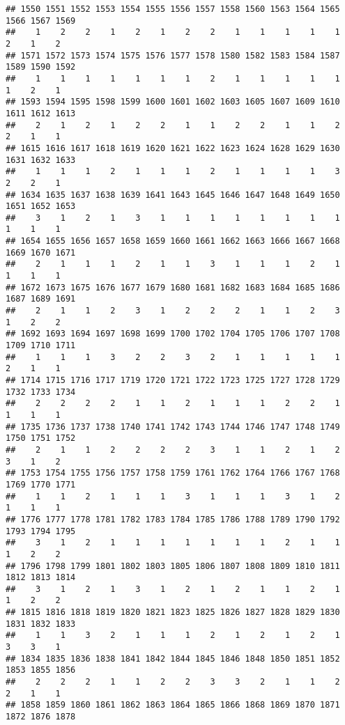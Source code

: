 \documentclass[
]{article}
\begin{document}
\begin{verbatim}
## 1550 1551 1552 1553 1554 1555 1556 1557 1558 1560 1563 1564 1565 1566 1567 1569 
##    1    2    2    1    2    1    2    2    1    1    1    1    1    2    1    2 
## 1571 1572 1573 1574 1575 1576 1577 1578 1580 1582 1583 1584 1587 1589 1590 1592 
##    1    1    1    1    1    1    1    2    1    1    1    1    1    1    2    1 
## 1593 1594 1595 1598 1599 1600 1601 1602 1603 1605 1607 1609 1610 1611 1612 1613 
##    2    1    2    1    2    2    1    1    2    2    1    1    2    2    1    1 
## 1615 1616 1617 1618 1619 1620 1621 1622 1623 1624 1628 1629 1630 1631 1632 1633 
##    1    1    1    2    1    1    1    2    1    1    1    1    3    2    2    1 
## 1634 1635 1637 1638 1639 1641 1643 1645 1646 1647 1648 1649 1650 1651 1652 1653 
##    3    1    2    1    3    1    1    1    1    1    1    1    1    1    1    1 
## 1654 1655 1656 1657 1658 1659 1660 1661 1662 1663 1666 1667 1668 1669 1670 1671 
##    2    1    1    1    2    1    1    3    1    1    1    2    1    1    1    1 
## 1672 1673 1675 1676 1677 1679 1680 1681 1682 1683 1684 1685 1686 1687 1689 1691 
##    2    1    1    2    3    1    2    2    2    1    1    2    3    1    2    2 
## 1692 1693 1694 1697 1698 1699 1700 1702 1704 1705 1706 1707 1708 1709 1710 1711 
##    1    1    1    3    2    2    3    2    1    1    1    1    1    2    1    1 
## 1714 1715 1716 1717 1719 1720 1721 1722 1723 1725 1727 1728 1729 1732 1733 1734 
##    2    2    2    2    1    1    2    1    1    1    2    2    1    1    1    1 
## 1735 1736 1737 1738 1740 1741 1742 1743 1744 1746 1747 1748 1749 1750 1751 1752 
##    2    1    1    2    2    2    2    3    1    1    2    1    2    3    1    2 
## 1753 1754 1755 1756 1757 1758 1759 1761 1762 1764 1766 1767 1768 1769 1770 1771 
##    1    1    2    1    1    1    3    1    1    1    3    1    2    1    1    1 
## 1776 1777 1778 1781 1782 1783 1784 1785 1786 1788 1789 1790 1792 1793 1794 1795 
##    3    1    2    1    1    1    1    1    1    1    2    1    1    1    2    2 
## 1796 1798 1799 1801 1802 1803 1805 1806 1807 1808 1809 1810 1811 1812 1813 1814 
##    3    1    2    1    3    1    2    1    2    1    1    2    1    1    2    2 
## 1815 1816 1818 1819 1820 1821 1823 1825 1826 1827 1828 1829 1830 1831 1832 1833 
##    1    1    3    2    1    1    1    2    1    2    1    2    1    3    3    1 
## 1834 1835 1836 1838 1841 1842 1844 1845 1846 1848 1850 1851 1852 1853 1855 1856 
##    2    2    2    1    1    2    2    3    3    2    1    1    2    2    1    1 
## 1858 1859 1860 1861 1862 1863 1864 1865 1866 1868 1869 1870 1871 1872 1876 1878 

\end{verbatim}
\end{document}

